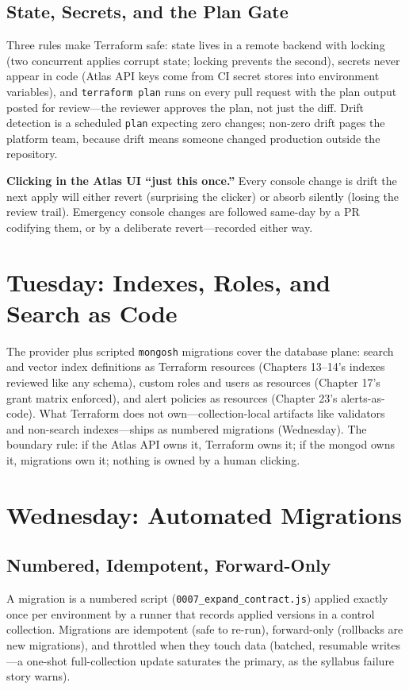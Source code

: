 \subsection{State, Secrets, and the Plan Gate}
Three rules make Terraform safe: state lives in a remote backend with locking (two concurrent applies corrupt state; locking prevents the second), secrets never appear in code (Atlas API keys come from CI secret stores into environment variables), and \texttt{terraform plan} runs on every pull request with the plan output posted for review---the reviewer approves the plan, not just the diff. Drift detection is a scheduled \texttt{plan} expecting zero changes; non-zero drift pages the platform team, because drift means someone changed production outside the repository.

\begin{pitfall}
\textbf{Clicking in the Atlas UI ``just this once.''} Every console change is drift the next apply will either revert (surprising the clicker) or absorb silently (losing the review trail). Emergency console changes are followed same-day by a PR codifying them, or by a deliberate revert---recorded either way.
\end{pitfall}

\section{Tuesday: Indexes, Roles, and Search as Code}
The provider plus scripted \texttt{mongosh} migrations cover the database plane: search and vector index definitions as Terraform resources (Chapters 13--14's indexes reviewed like any schema), custom roles and users as resources (Chapter 17's grant matrix enforced), and alert policies as resources (Chapter 23's alerts-as-code). What Terraform does not own---collection-local artifacts like validators and non-search indexes---ships as numbered migrations (Wednesday). The boundary rule: if the Atlas API owns it, Terraform owns it; if the mongod owns it, migrations own it; nothing is owned by a human clicking.

\section{Wednesday: Automated Migrations}
\subsection{Numbered, Idempotent, Forward-Only}
A migration is a numbered script (\texttt{0007\_expand\_contract.js}) applied exactly once per environment by a runner that records applied versions in a control collection. Migrations are idempotent (safe to re-run), forward-only (rollbacks are new migrations), and throttled when they touch data (batched, resumable writes---a one-shot full-collection update saturates the primary, as the syllabus failure story warns).

